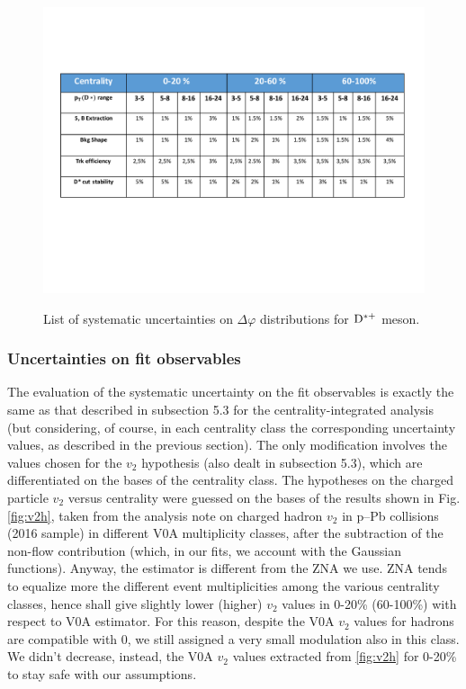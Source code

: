 \begin{figure}
\centering
{\includegraphics[width=0.95\linewidth]{figuresVsCent/Dstar/DstarSystematics_final.pdf}}
\caption{List of systematic uncertainties on $\Delta\varphi$ distributions for ${\rm D^{*+}}$ meson.}
\label{fig:TableSystDstar}
\end{figure}


\subsubsection{Uncertainties on fit observables}
The evaluation of the systematic uncertainty on the fit observables is exactly the same as that described in subsection 5.3 for the centrality-integrated analysis (but considering, of course, in each centrality class the corresponding uncertainty values, as described in the previous section).
The only modification involves the values chosen for the $v_2$ hypothesis (also dealt in subsection 5.3), which are differentiated on the bases of the centrality class.
The hypotheses on the charged particle $v_2$ versus centrality were guessed on the bases of the results shown in Fig. \ref{fig:v2h}, taken from the analysis note on charged hadron $v_2$ in p--Pb collisions (2016 sample) in different V0A multiplicity classes, after the subtraction of the non-flow contribution (which, in our fits, we account with the Gaussian functions). Anyway, the estimator is different from the ZNA we use. ZNA tends to equalize more the different event multiplicities among the various centrality classes, hence shall give slightly lower (higher) $v_2$ values in 0-20\% (60-100\%) with respect to V0A estimator. For this reason, despite the V0A $v_2$ values for hadrons are compatible with 0, we still assigned a very small modulation also in this class. We didn't decrease, instead, the V0A $v_2$ values extracted from \ref{fig:v2h} for 0-20\% to stay safe with our assumptions.

